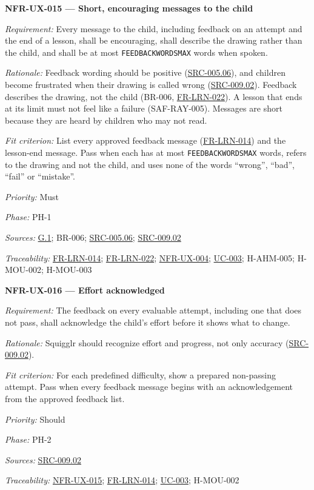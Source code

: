 \documentclass[12pt]{article}
\renewcommand{\_}{\textunderscore\allowbreak}%
\newcommand{\goalref}[1]{\hyperref[goal:#1]{G.#1}}
\newcommand{\ucref}[1]{\hyperref[uc:#1]{\mbox{UC-#1}}}
\newenvironment{srsrequirement}[2]{%
  \par\medskip\noindent\phantomsection\label{req:#1}%
  \textbf{#1 --- #2}\par\nobreak\smallskip }{\par\medskip}
\newcommand{\reqfield}[2]{\noindent\textit{#1:} #2\par}
\newcommand{\reqshall}[1]{\reqfield{Requirement}{#1}}
\newcommand{\reqrationale}[1]{\reqfield{Rationale}{#1}}
\newcommand{\reqfit}[1]{\reqfield{Fit criterion}{#1}}
\newcommand{\reqpriority}[1]{\reqfield{Priority}{#1}}
\newcommand{\reqphase}[1]{\reqfield{Phase}{#1}}
\newcommand{\reqsources}[1]{\reqfield{Sources}{#1}}
\newcommand{\reqtraces}[1]{\reqfield{Traceability}{#1}}
\newcommand{\reqref}[1]{\hyperref[req:#1]{#1}}
\newcommand{\srcref}[1]{\hyperref[src:#1]{SRC-#1}}
\providecommand{\ucref}[1]{\hyperref[uc:#1]{UC-#1}}
\begin{document}
\begin{srsrequirement}{NFR-UX-015}{Short, encouraging messages to the child}
\reqshall{Every message to the child, including feedback on an attempt and the
end of a lesson, shall be encouraging, shall describe the drawing rather than
the child, and shall be at most \texttt{FEEDBACK\_WORDS\_MAX} words when
spoken.} \reqrationale{Feedback wording should be positive (\srcref{005.06}),
and children become frustrated when their drawing is called wrong
(\srcref{009.02}). Feedback describes the drawing, not the child (BR-006,
\mbox{\reqref{FR-LRN-022}}). A lesson that ends at its limit must not feel like
a failure (SAF-RAY-005). Messages are short because they are heard by children
who may not read.} \reqfit{List every approved feedback message
(\mbox{\reqref{FR-LRN-014}}) and the lesson-end message. Pass when each has at
most \texttt{FEEDBACK\_WORDS\_MAX} words, refers to the drawing and not the
child, and uses none of the words ``wrong'', ``bad'', ``fail'' or ``mistake''.}
  \reqpriority{Must}
  \reqphase{PH-1}
  \reqsources{\goalref{1}; BR-006; \srcref{005.06}; \srcref{009.02}}
  \reqtraces{\mbox{\reqref{FR-LRN-014}}; \mbox{\reqref{FR-LRN-022}};
  \reqref{NFR-UX-004}; \ucref{003}; H-AHM-005; H-MOU-002; H-MOU-003}
\end{srsrequirement}

\begin{srsrequirement}{NFR-UX-016}{Effort acknowledged}
  \reqshall{The feedback on every evaluable attempt, including one that does not
pass, shall acknowledge the child's effort before it shows what to change.}
\reqrationale{Squigglr should recognize effort and progress, not only accuracy
(\srcref{009.02}).} \reqfit{For each predefined difficulty, show a prepared
non-passing attempt. Pass when every feedback message begins with an
acknowledgement from the approved feedback list.}
  \reqpriority{Should}
  \reqphase{PH-2}
  \reqsources{\srcref{009.02}} \reqtraces{\reqref{NFR-UX-015};
  \mbox{\reqref{FR-LRN-014}}; \ucref{003}; H-MOU-002}
\end{srsrequirement}
\end{document}
